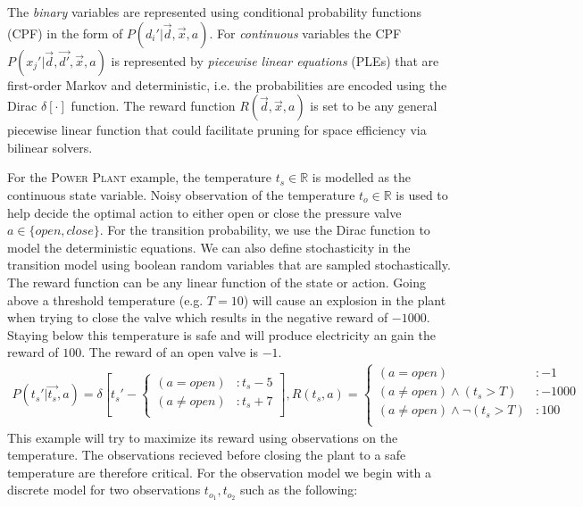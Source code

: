\documentclass{article} %
\begin{document}
The \emph{binary} variables are represented using conditional probability functions (CPF) in the form of $P(d_i'|\vec{d},\vec{x},a)$. For \emph{continuous} variables
the CPF $P(x_j'|\vec{d},\vec{d'},\vec{x},a)$ is represented by \emph{piecewise
linear equations} (PLEs) that are first-order Markov and deterministic, i.e. the probabilities are encoded using the Dirac $\delta[\cdot]$ function.  The reward function $R(\vec{d},\vec{x},a)$ is set to be any general piecewise linear  function that could facilitate pruning for space efficiency via bilinear solvers. 

For the \textsc{Power Plant} example, the temperature $t_s \in \mathbb{R}$ is modelled as the continuous state variable. Noisy observation of the temperature $t_o \in \mathbb{R}$ is used to help decide the optimal action to either open or close the pressure valve $a \in \{open,close\}$. 
For the transition probability, we use the Dirac function to model the deterministic equations. We can also define stochasticity in the transition model using boolean random variables that are sampled stochastically.  The reward function can be any linear function of the state or action. Going above a threshold temperature (e.g. $T=10$) will cause an explosion in the plant when trying to close the valve which results in the negative reward of $-1000$. Staying below this temperature is safe and will produce electricity an gain the reward of $100$. The reward of an open valve is $-1$.
\begin{align}
P(t_s'|\vec{t_s},a)= \delta\left[ t_s' - 
\begin{cases}
 (a=open) &: t_s - 5 \\ 
(a \neq open) &: t_s + 7 \\
\end{cases}
\right]\nonumber
, 
R(t_s,a) = 
\begin{cases}
 (a=open) &: -1 \\
(a \neq open)\wedge (t_s>T) &: -1000 \\
(a \neq open)\wedge \neg(t_s>T) &: 100 \\
\end{cases}\nonumber
\end{align}
This example will try to maximize its reward using observations on the temperature. The observations recieved before closing the plant to a safe temperature are therefore critical.  For the observation model we begin with a discrete model for two observations $t_{o_1},t_{o_2}$ such as the following:  
\end{document}
